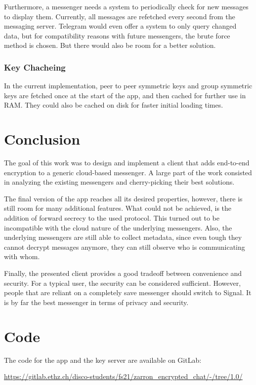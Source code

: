 \documentclass[a4paper, oneside]{discothesis}
\begin{document}
Furthermore, a messenger needs a system to periodically check for new messages to display them. Currently, all messages are refetched every second from the messaging server. Telegram would even offer a system to only query changed data, but for compatibility reasons with future messengers, the brute force method is chosen. But there would also be room for a better solution.

\subsection{Key Chacheing}

In the current implementation, peer to peer symmetric keys and group symmetric keys are fetched once at the start of the app, and then cached for further use in RAM. They could also be cached on disk for faster initial loading times.

\chapter{Conclusion}

The goal of this work was to design and implement a client that adds end-to-end encryption to a generic cloud-based messenger. A large part of the work consisted in analyzing the existing messengers and cherry-picking their best solutions.

The final version of the app reaches all its desired properties, however, there is still room for many additional features. What could not be achieved, is the addition of forward secrecy to the used protocol. This turned out to be incompatible with the cloud nature of the underlying messengers. Also, the underlying messengers are still able to collect metadata, since even tough they cannot decrypt messages anymore, they can still observe who is communicating with whom. 

Finally, the presented client provides a good tradeoff between convenience and security. For a typical user, the security can be considered sufficient. However, people that are reliant on a completely save messenger should switch to Signal. It is by far the best messenger in terms of privacy and security. 




\appendix
\chapter{Code}

The code for the app and the key server are available on GitLab:

\url{https://gitlab.ethz.ch/disco-students/fs21/zarron_encrypted_chat/-/tree/1.0/}
\end{document}
